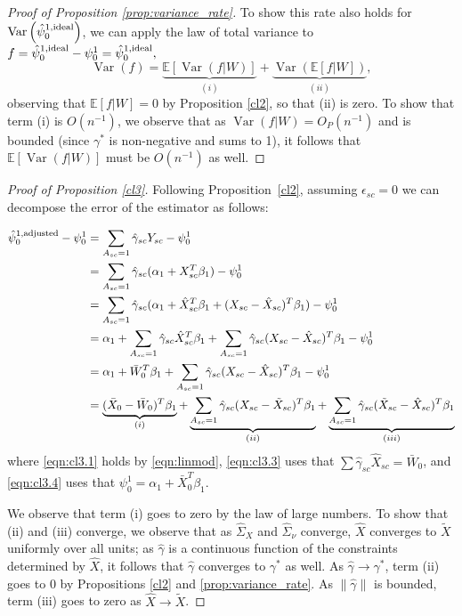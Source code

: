 \begin{proof}[Proof of Proposition \ref{prop:variance_rate}]
To show this rate also holds for $\operatorname{Var}\left(\hat{\psi}_0^{1,\textup{ideal}}\right)$, we can apply the law of total variance to $f = \hat{\psi}_0^{1,\textup{ideal}} - \psi_0^1 = \hat{\psi}_0^{1,\textup{ideal}},$
\[ \operatorname{Var}(f) = \underbrace{\mathbb{E}[\operatorname{Var}(f|W)]}_{(i)} + \underbrace{\operatorname{Var}(\mathbb{E}[f|W])}_{(ii)}, \]
observing that $\mathbb{E}[f|W] = 0$ by Proposition \ref{cl2}, so that (ii) is zero. To show that term (i) is $O(n^{-1})$, we observe that as $\operatorname{Var}(f|W) = O_P(n^{-1})$ and is bounded (since $\gamma^*$ is non-negative and sums to 1), it follows that  $\mathbb{E}[ \operatorname{Var}(f|W)]$ must be $O(n^{-1})$ as well.
\end{proof}

\begin{proof}[Proof of Proposition \ref{cl3}]
Following Proposition~\ref{cl2}, assuming $\epsilon_{sc}=0$ we can decompose the error of the estimator as follows:

\begin{align}
\nonumber    \hat{\psi}^{1,\textup{adjusted}}_0 - \psi_0^1 &= \sum_{A_{sc}=1} \hat{\gamma}_{sc} Y_{sc} - \psi_0^1 \\
    & = \sum_{A_{sc}=1} \hat{\gamma}_{sc} (\alpha_1 + X_{sc}^T \beta_1) - \psi_0^1 \label{eqn:cl3.1}\\
    \nonumber & = \sum_{A_{sc}=1} \hat{\gamma}_{sc} (\alpha_1 + \hat{X}_{sc}^T \beta_1 + (X_{sc} - \hat{X}_{sc})^T \beta_1 ) - \psi_0^1 \label{eqn:cl3.2}\\
    \nonumber & = \alpha_1 + \sum_{A_{sc}=1} \hat{\gamma}_{sc} \hat{X}_{sc}^T \beta_1 + \sum_{A_{sc}=1} \hat{\gamma}_{sc}(X_{sc} - \hat{X}_{sc})^T \beta_1  - \psi_0^1 \label{eqn:cl3.3}\\
    & = \alpha_1 + \bar{W}_0^T \beta_1 + \sum_{A_{sc}=1} \hat{\gamma}_{sc}(X_{sc} - \hat{X}_{sc})^T \beta_1  - \psi_0^1 \label{eqn:cl3.3}\\
    & = \underbrace{(\bar{X}_0 - \bar{W}_0)^T \beta_1}_{(i)} + \underbrace{\sum_{A_{sc}=1} \hat{\gamma}_{sc}(X_{sc} - \tilde{X}_{sc})^T \beta_1}_{(ii)} + \underbrace{\sum_{A_{sc}=1} \hat{\gamma}_{sc} (\tilde{X}_{sc} - \hat{X}_{sc})^T \beta_1}_{(iii)} \label{eqn:cl3.4}
\end{align}
where \eqref{eqn:cl3.1} holds by \eqref{eqn:linmod}, \eqref{eqn:cl3.3} uses that $\sum \hat{\gamma}_{sc} \hat{X}_{sc} = \bar{W}_0$, and \eqref{eqn:cl3.4} uses that $\psi_{0}^1 = \alpha_1 + \bar{X}_0^T \beta_1$.

We observe that term (i) goes to zero by the law of large numbers. To show that (ii) and (iii) converge, we observe that as  $\hat{\Sigma}_X$ and $\hat{\Sigma}_\nu$ converge, $\hat{X}$ converges to $\tilde{X}$ uniformly over all units; as $\hat{\gamma}$ is a continuous function of the constraints determined by $\hat{X}$, it follows that $\hat{\gamma}$ converges to $\gamma^*$ as well. As $\hat{\gamma} \to \gamma^*$, term (ii) goes to 0 by Propositions \ref{cl2} and \ref{prop:variance_rate}. As $\|\hat{\gamma}\|$ is bounded, term (iii) goes to zero as $\hat{X} \to \tilde{X}$.

\end{proof}

